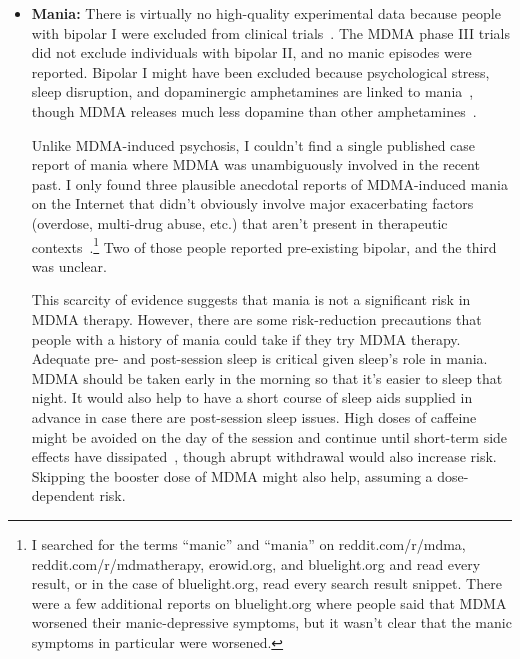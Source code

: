 \documentclass[11pt,oneside]{book}
\let\cite\parencite
\begin{document}
\begin{itemize}
    Given its origin in the combination of fear and sensory perception, I think HPPD is likely one of many possible somatic symptoms of mental illness in the model of \textcite{berghPsychogenic} that I expand on in \cref{psychogenic}. In that model, the initial experience creates a link between visual distortions and fear. The resulting HPPD would be either fear-driven hyperfocus on normal visual distortions that are typically filtered out of awareness or fear-driven hyperfocus on abnormal visual distortions that the brain recreates as top-down sensory fudging. Either could be treated with reconsolidation, which is congruent with the finding from \textcite{halpernHPPD} that HPPD improves as the associated anxiety and dissociation are treated.
    \item \textbf{Mania:} There is virtually no high-quality experimental data because people with bipolar I were excluded from clinical trials~\cite{mitchellMDMAClinicalTrial2}. The MDMA phase III trials did not exclude individuals with bipolar II, and no manic episodes were reported. Bipolar I might have been excluded because psychological stress, sleep disruption, and dopaminergic amphetamines are linked to mania~\cite{salvadoreMania}, though MDMA releases much less dopamine than other amphetamines~\cite{kankaanpÄÄDopamine}.

    Unlike MDMA-induced psychosis, I couldn't find a single published case report of mania where MDMA was unambiguously involved in the recent past. I only found three plausible anecdotal reports of MDMA-induced mania on the Internet that didn't obviously involve major exacerbating factors (overdose, multi-drug abuse, etc.) that aren't present in therapeutic contexts~\cite{erowidMania1,erowidMania2,bluelightMania1}.\footnote{I searched for the terms \enquote{manic} and \enquote{mania} on reddit.com/r/mdma, reddit.com/r/mdmatherapy, erowid.org, and bluelight.org and read every result, or in the case of bluelight.org, read every search result snippet. There were a few additional reports on bluelight.org where people said that MDMA worsened their manic-depressive symptoms, but it wasn't clear that the manic symptoms in particular were worsened.} Two of those people reported pre-existing bipolar, and the third was unclear.

    This scarcity of evidence suggests that mania is not a significant risk in MDMA therapy. However, there are some risk-reduction precautions that people with a history of mania could take if they try MDMA therapy. Adequate pre- and post-session sleep is critical given sleep's role in mania. MDMA should be taken early in the morning so that it's easier to sleep that night. It would also help to have a short course of sleep aids supplied in advance in case there are post-session sleep issues. High doses of caffeine might be avoided on the day of the session and continue until short-term side effects have dissipated~\cite{laraCaffeine}, though abrupt withdrawal would also increase risk. Skipping the booster dose of MDMA might also help, assuming a dose-dependent risk.
\end{itemize}
\end{document}
